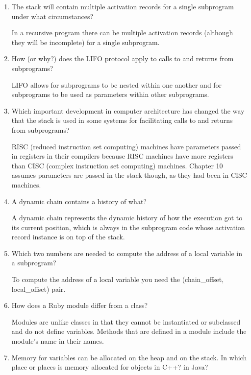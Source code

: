 \begin{enumerate}
  \item The stack will contain multiple activation
    records for a single subprogram under what
    circumstances?
    
    In a recursive program there can be multiple activation records (although they will be incomplete) for a single subprogram.


  \item How (or why?) does the LIFO protocol apply to
    calls to and returns from subprograms?
    
    LIFO allows for subprograms to be nested within one another and for subprograms to be used as parameters within other subprograms.

  \item Which important development in computer architecture
    has changed the way that the stack is used in some
    systems for facilitating calls to and returns from
    subprograms?
    
    RISC (reduced instruction set computing) machines have parameters passed in registers in their compilers because RISC machines have more registers than CISC (complex instruction set computing) machines. Chapter 10 assumes parameters are passed in the stack though, as they had been in CISC machines.


  \item A dynamic chain contains a history of what?
  
  A dynamic chain represents the dynamic history of how the execution got to its current position, which is always in the subprogram code whose activation record instance is on top of the stack.


  \item Which two numbers are needed to compute
    the address of a local variable in a subprogram?

To compute the address of a local variable you need the (chain_offset, local_offset) pair.


  \item How does a Ruby module differ from a class?
  
  Modules are unlike classes in that they cannot be instantiated or subclassed and do not define variables. Methods that are defined in a module include the module’s name in their names.


  \item Memory for variables can be allocated on the heap
    and on the stack. In which place or places is memory
    allocated for objects in C++? in Java?
    

\end{enumerate}
